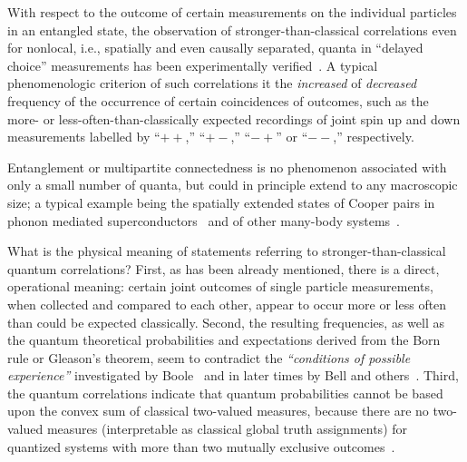 \documentclass[pra,amsfonts,showpacs,showkeys,preprint]{revtex4}
\begin{document}
With respect to the outcome of certain measurements on the individual particles in an entangled state,
the observation of stronger-than-classical correlations even for nonlocal, i.e., spatially and even causally separated, quanta
in  ``delayed choice'' measurements has been experimentally verified~\cite{wjswz-98}.
A typical phenomenologic criterion of such correlations it the {\em increased} of {\em decreased} frequency of the occurrence of certain coincidences of outcomes,
such as the more- or less-often-than-classically expected recordings of joint spin up and down measurements labelled by ``$++$,'' ``$+-$,'' ``$-+$'' or ``$--$,'' respectively.

Entanglement or multipartite connectedness is no phenomenon associated with only a small number of quanta, but could in principle extend
to any macroscopic size; a typical example being the spatially extended states of Cooper pairs in phonon mediated superconductors~\cite{Weisskopf81}
and of other many-body systems~\cite{amico:517}.

What is the physical meaning of statements referring to stronger-than-classical quantum correlations?
First, as has been already mentioned, there is a direct, operational meaning: certain joint outcomes of single particle measurements, when collected and compared to each other,
appear to occur more or less often than could be expected classically.
Second, the resulting frequencies, as well as the quantum theoretical probabilities and expectations derived from the Born rule or Gleason's theorem,
seem to contradict the {\em ``conditions of possible experience''} investigated by Boole~\cite{Boole,Boole-62} and in later times by
Bell and others~\cite{bell,Pit-94,2000-poly}.
Third, the quantum correlations indicate that quantum probabilities cannot be based upon the convex sum of classical two-valued measures,
because there are no two-valued measures (interpretable as classical global truth assignments) for quantized systems
with more than two mutually exclusive outcomes~\cite{specker-60,kochen1,ZirlSchl-65,Alda,Alda2,kamber64,kamber65,svozil-tkadlec,cabello-96}.
\end{document}
